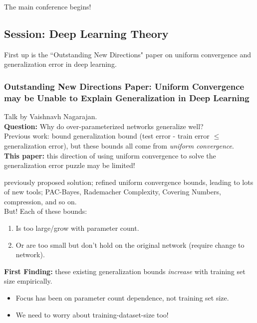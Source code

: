 The main conference begins!

\subsection{Session: Deep Learning Theory}

First up is the ``Outstanding New Directions" paper on uniform convergence and generalization error in deep learning.

\spacerule
\subsubsection{Outstanding New Directions Paper: Uniform Convergence may be Unable to Explain Generalization in Deep Learning~\cite{nagarajan2019uniform}}

Talk by Vaishnavh Nagarajan. \\

{\bf Question:} Why do over-parameterized networks generalize well? \\


Previous work: bound generalization bound (test error - train error $\leq$ generalization error), but these bounds all come from {\it uniform convergence}. \\

{\bf This paper:} this direction of using uniform convergence to solve the generalization error puzzle may be limited! \\


previously proposed solution; refined uniform convergence bounds, leading to lots of new tools; PAC-Bayes, Rademacher Complexity, Covering Numbers, compression, and so on. \\

But! Each of these bounds:
\begin{enumerate}
    \item Is too large/grow with parameter count.
    \item Or are too small but don't hold on the original network (require change to network).
\end{enumerate}


{\bf First Finding:} these existing generalization bounds {\it increase} with training set size empirically.
\begin{itemize}
    \item Focus has been on parameter count dependence, not training set size.
    \item We need to worry about training-dataset-size too!
\end{itemize}


